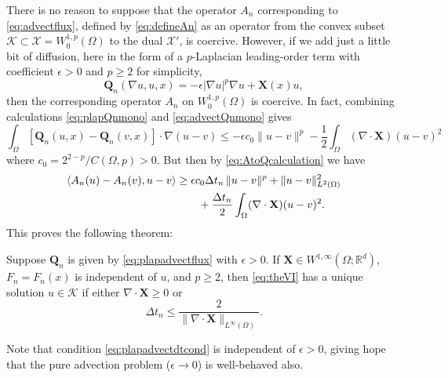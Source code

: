 \documentclass[final,leqno,onefignum,onetabnum]{siamltex1213bueler}
\newcommand\bQ{\mathbf{Q}}
\newcommand\bX{\mathbf{X}}
\newcommand{\Div}{\nabla\cdot}
\newcommand\eps{\epsilon}
\renewcommand{\grad}{\nabla}
\newcommand{\ip}[2]{\ensuremath{\left<#1,#2\right>}}
\newcommand\RR{\mathbb{R}}
\begin{document}
There is no reason to suppose that the operator $A_n$ corresponding to \eqref{eq:advectflux}, defined by \eqref{eq:defineAn} as an operator from the convex subset $\mathcal{K} \subset \mathcal{X} = W_0^{1,p}(\Omega)$ to the dual $\mathcal{X}'$, is coercive.  However, if we add just a little bit of diffusion, here in the form of a $p$-Laplacian leading-order term with coefficient $\eps>0$ and $p\ge 2$ for simplicity,
\begin{equation}
  \bQ_n(\grad u,u,x) = -\eps |\grad u|^p \grad u + \bX(x) u,   \label{eq:plapadvectflux}
\end{equation}
then the corresponding operator $A_n$ on $W_0^{1,p}(\Omega)$ is coercive.  In fact, combining calculations \eqref{eq:plapQnmono} and \eqref{eq:advectQnmono} gives
\begin{equation}
\int_\Omega \left[\bQ_n(u,x) - \bQ_n(v,x)\right] \cdot \grad (u - v) \le - \eps c_0 \|u-v\|^p - \frac{1}{2} \int_\Omega (\Div\bX) (u-v)^2
\end{equation}
where $c_0=2^{2-p}/C(\Omega,p)>0$.  But then by \eqref{eq:AtoQcalculation} we have
\begin{align}
\ip{A_n(u) - A_n(v)}{u-v} &\ge \eps c_0 \Delta t_n\, \|u-v\|^p + \|u-v\|_{L^2(\Omega)}^2 \\
  &\qquad + \frac{\Delta t_n}{2} \int_\Omega (\Div\bX) (u-v)^2. \notag
\end{align}
This proves the following theorem:

\medskip
\begin{theorem}  \label{thm:plapadvectwellposed}  Suppose $\bQ_n$ is given by \eqref{eq:plapadvectflux} with $\eps>0$.  If $\bX \in W^{1,\infty}(\Omega;\RR^d)$, $F_n=F_n(x)$ is independent of $u$, and $p\ge 2$, then \eqref{eq:theVI} has a unique solution $u\in\mathcal{K}$ if either $\Div \bX \ge 0$ or
\begin{equation}
  \Delta t_n \le \frac{2}{\|\Div \bX\|_{L^\infty(\Omega)}}. \label{eq:plapadvectdtcond}
\end{equation}
\end{theorem}

Note that condition \eqref{eq:plapadvectdtcond} is independent of $\eps>0$, giving hope that the pure advection problem ($\eps \to 0$) is well-behaved also.
\end{document}
